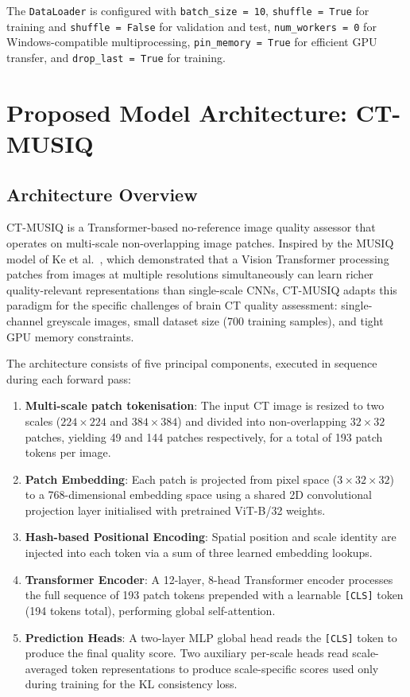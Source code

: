 The \texttt{DataLoader} is configured with \texttt{batch\_size = 10},
\texttt{shuffle = True} for training and \texttt{shuffle = False} for validation and
test, \texttt{num\_workers = 0} for Windows-compatible multiprocessing,
\texttt{pin\_memory = True} for efficient GPU transfer, and \texttt{drop\_last = True}
for training.


\section{Proposed Model Architecture: CT-MUSIQ}
\label{sec:architecture}

\subsection{Architecture Overview}

CT-MUSIQ is a Transformer-based no-reference image quality assessor that operates on
multi-scale non-overlapping image patches. Inspired by the MUSIQ model of Ke et al.\
\cite{ke2021musiq}, which demonstrated that a Vision Transformer processing patches
from images at multiple resolutions simultaneously can learn richer quality-relevant
representations than single-scale CNNs, CT-MUSIQ adapts this paradigm for the specific
challenges of brain CT quality assessment: single-channel greyscale images, small
dataset size (700 training samples), and tight GPU memory constraints.

The architecture consists of five principal components, executed in sequence during each
forward pass:

\begin{enumerate}
    \item \textbf{Multi-scale patch tokenisation}: The input CT image is resized to
          two scales ($224 \times 224$ and $384 \times 384$) and divided into
          non-overlapping $32 \times 32$ patches, yielding 49 and 144 patches
          respectively, for a total of 193 patch tokens per image.
    \item \textbf{Patch Embedding}: Each patch is projected from pixel space
          ($3 \times 32 \times 32$) to a 768-dimensional embedding space using a shared
          2D convolutional projection layer initialised with pretrained ViT-B/32 weights.
    \item \textbf{Hash-based Positional Encoding}: Spatial position and scale identity
          are injected into each token via a sum of three learned embedding lookups.
    \item \textbf{Transformer Encoder}: A 12-layer, 8-head Transformer encoder
          processes the full sequence of 193 patch tokens prepended with a learnable
          \texttt{[CLS]} token (194 tokens total), performing global self-attention.
    \item \textbf{Prediction Heads}: A two-layer MLP global head reads the
          \texttt{[CLS]} token to produce the final quality score. Two auxiliary
          per-scale heads read scale-averaged token representations to produce
          scale-specific scores used only during training for the KL consistency loss.
\end{enumerate}


